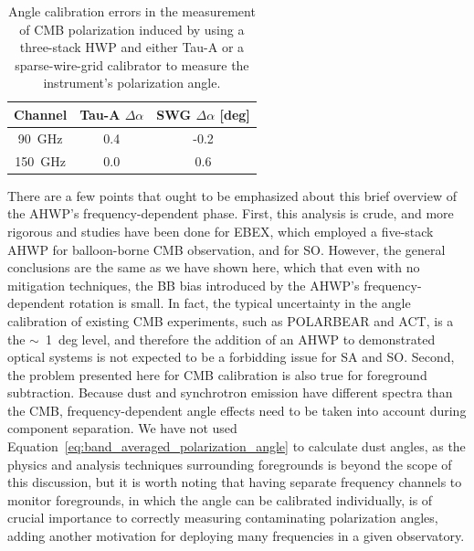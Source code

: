 \begin{table}[!t]
    \centering
    \begin{tabular}{c|c|c}
        \hline
        Channel &  Tau-A $\Delta \alpha$ & SWG $\Delta \alpha$ [deg] \\
        \hline
        \hline
        90~GHz & 0.4 & -0.2 \\
        \hline
        150~GHz & 0.0 & 0.6 \\
        \hline
    \end{tabular}
    \caption{Angle calibration errors in the measurement of CMB polarization induced by using a three-stack HWP and either Tau-A or a sparse-wire-grid calibrator to measure the instrument's polarization angle.}
    \label{tab:ahwp_angle_calibration_error}
\end{table}

There are a few points that ought to be emphasized about this brief overview of the AHWP's frequency-dependent phase. First, this analysis is crude, and more rigorous and studies have been done for EBEX, which employed a five-stack AHWP for balloon-borne CMB observation, and for SO. However, the general conclusions are the same as we have shown here, which that even with no mitigation techniques, the BB bias introduced by the AHWP's frequency-dependent rotation is small. In fact, the typical uncertainty in the angle calibration of existing CMB experiments, such as POLARBEAR and ACT, is a the $\sim$~1~deg level, and therefore the addition of an AHWP to demonstrated optical systems is not expected to be a forbidding issue for SA and SO. Second, the problem presented here for CMB calibration is also true for foreground subtraction. Because dust and synchrotron emission have different spectra than the CMB, frequency-dependent angle effects need to be taken into account during component separation. We have not used Equation~\ref{eq:band_averaged_polarization_angle} to calculate dust angles, as the physics and analysis techniques surrounding foregrounds is beyond the scope of this discussion, but it is worth noting that having separate frequency channels to monitor foregrounds, in which the angle can be calibrated individually, is of crucial importance to correctly measuring contaminating polarization angles, adding another motivation for deploying many frequencies in a given observatory.

